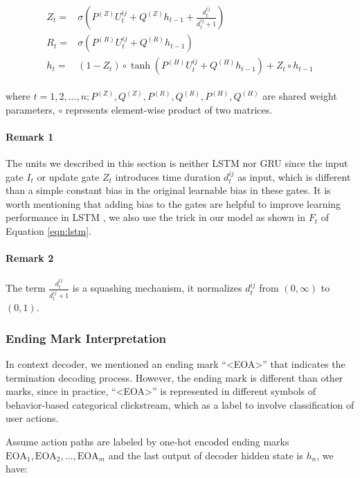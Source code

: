 \begin{align}
\label{eqn:lstm}
\begin{split}
    Z_t =& \sigma ( P^{(Z)} U^{ij}_t + Q^{(Z)} h_{t-1} + \frac{d^{ij}_t}{d^{ij}_t + 1} ) \\
    R_t =& \sigma ( P^{(R)} U^{ij}_t + Q^{(R)} h_{t-1} ) \\
    h_t =& ( 1 - Z_t ) \circ \tanh ( P^{(H)} U^{ij}_t + Q^{(H)} h_{t-1} ) + Z_t \circ h_{t-1}
\end{split}
\end{align}

where $t = 1, 2, ..., n; P^{(Z)}, Q^{(Z)}, P^{(R)}, Q^{(R)}, P^{(H)}, Q^{(H)}$ are shared weight parameters, 
$\circ$ represents element-wise product of two matrices.

\paragraph{Remark 1} The units we described in this section is neither LSTM nor GRU since
the input gate $I_t$ or update gate $Z_t$ introduces time duration $d^{ij}_t$ as input,
which is different than a simple constant bias in the original learnable bias in these gates. 
It is worth mentioning that adding bias to the gates are helpful to 
improve learning performance in LSTM \cite{Jozefowicz:2015:EER:3045118.3045367}, 
we also use the trick in our model as shown in $F_t$ of Equation \ref{eqn:lstm}.

\paragraph{Remark 2} The term $\frac{d^{ij}_t}{d^{ij}_t + 1}$ is a squashing mechanism,
it normalizes $d^{ij}_t$ from $(0, \infty)$ to $(0, 1)$.

\subsubsection{Ending Mark Interpretation}
\label{sec:mark-interpretation}

In context decoder, we mentioned an ending mark ``<EOA>'' that indicates the termination 
decoding process. However, the ending mark is different than other marks, since in practice,
``<EOA>'' is represented in different symbols of behavior-based categorical clickstream, which as a label to
involve classification of user actions.

Assume action paths are labeled by one-hot encoded ending marks 
$\text{EOA}_1, \text{EOA}_2, ..., \text{EOA}_m$ and the last output
of decoder hidden state is $h_n$, we have:

